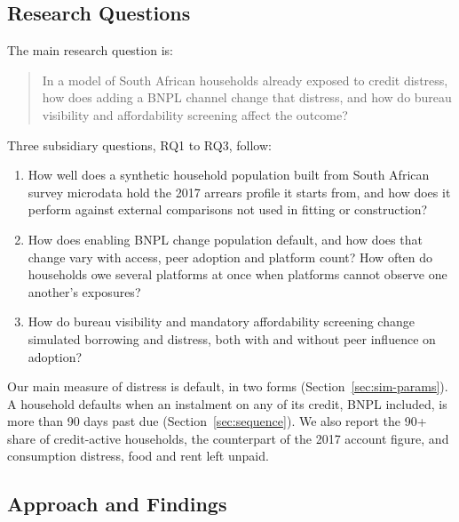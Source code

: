 \subsection{Research Questions}
\label{sec:rqs}

The main research question is:

\begin{quote}
    In a model of South African households already exposed to credit distress, how does
    adding a \ac{BNPL} channel change that distress, and how do bureau visibility and
    affordability screening affect the outcome?
\end{quote}

Three subsidiary questions, RQ1 to RQ3, follow:

\begin{enumerate}
    \item How well does a synthetic household population built from South African survey
    microdata hold the 2017 arrears profile it starts from, and how does it perform
    against external comparisons not used in fitting or construction?
    \item How does enabling \ac{BNPL} change population default, and how does that change
    vary with access, peer adoption and platform count? How often do households owe several
    platforms at once when platforms cannot observe one another's exposures?
    \item How do bureau visibility and mandatory affordability screening change simulated
    borrowing and distress, both with and without peer influence on adoption?
\end{enumerate}

Our main measure of distress is default, in two forms (Section~\ref{sec:sim-params}). A household
defaults when an instalment on any of its credit, \ac{BNPL} included, is more than 90 days past due
(Section~\ref{sec:sequence}). We also report the 90+ share of credit-active households, the
counterpart of the 2017 account figure, and consumption distress, food and rent left unpaid.

\subsection{Approach and Findings}


